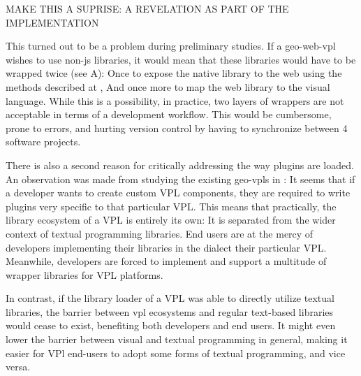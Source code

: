 MAKE THIS A SUPRISE: A REVELATION AS PART OF THE IMPLEMENTATION
\begin{note}

  This turned out to be a problem during preliminary studies.
  If a \ac{geo-web-vpl} wishes to use non-js libraries, it would mean that these libraries would have to be wrapped twice (see  A): 
  Once to expose the native library to the web using the methods described at ,
  And once more to map the web library to the visual language. 
  While this is a possibility, in practice, two layers of wrappers are not acceptable in terms of a development workflow.
  This would be cumbersome, prone to errors, and hurting version control by having to synchronize between 4 software projects. 
  
  There is also a second reason for critically addressing the way plugins are loaded. 
  An observation was made from studying the existing geo-vpls in :
  It seems that if a developer wants to create custom VPL components, they are required to write plugins very specific to that particular VPL.
  This means that practically, the library ecosystem of a VPL is entirely its own: 
  It is separated from the wider context of textual programming libraries. 
  End users are at the mercy of developers implementing their libraries in the dialect their particular VPL.
  Meanwhile, developers are forced to implement and support a multitude of wrapper libraries for VPL platforms.  
  
  In contrast, if the library loader of a VPL was able to directly utilize textual libraries, the barrier between vpl ecosystems and regular text-based libraries would cease to exist, benefiting both developers and end users. 
  It might even lower the barrier between visual and textual programming in general, making it easier for VPl end-users to adopt some forms of textual programming, and vice versa. 
  
  
\end{note}



